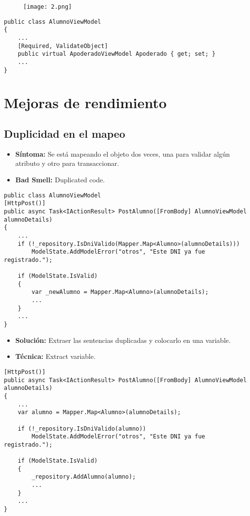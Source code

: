\begin{figure}[h]
	\texttt{[image: 2.png]}
	\centering
\end{figure}

\begin{lstlisting}[language={[Sharp]C}]
public class AlumnoViewModel
{
	...
	[Required, ValidateObject]
	public virtual ApoderadoViewModel Apoderado { get; set; }
	...
}
\end{lstlisting}

\section{Mejoras de rendimiento}

\subsection{Duplicidad en el mapeo}
\begin{itemize}
	\item \textbf{Síntoma:} Se está mapeando el objeto dos veces, una para validar algún atributo y otro para transaccionar.
	\item \textbf{Bad Smell:} Duplicated code.
\end{itemize}

\begin{lstlisting}[language={[Sharp]C}]
public class AlumnoViewModel
[HttpPost()]
public async Task<IActionResult> PostAlumno([FromBody] AlumnoViewModel alumnoDetails)
{
	...
	if (!_repository.IsDniValido(Mapper.Map<Alumno>(alumnoDetails)))
		ModelState.AddModelError("otros", "Este DNI ya fue registrado.");

	if (ModelState.IsValid)
	{
		var _newAlumno = Mapper.Map<Alumno>(alumnoDetails);
		...
	}
	...
}
\end{lstlisting}

\begin{itemize}	
	\item \textbf{Solución:} Extraer las sentencias duplicadas y colocarlo en una variable.
	\item \textbf{Técnica:} Extract variable.
\end{itemize}
	
\begin{lstlisting}[language={[Sharp]C}]
[HttpPost()]
public async Task<IActionResult> PostAlumno([FromBody] AlumnoViewModel alumnoDetails)
{
	...
	var alumno = Mapper.Map<Alumno>(alumnoDetails);

	if (!_repository.IsDniValido(alumno))
		ModelState.AddModelError("otros", "Este DNI ya fue registrado.");

	if (ModelState.IsValid)
	{
		_repository.AddAlumno(alumno);
		...
	}
	...
}
\end{lstlisting}
	
